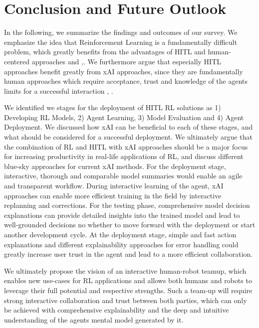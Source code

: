 \documentclass[twoside,11pt]{article}
\begin{document}
\section{Conclusion and Future Outlook}
In the following, we summarize the findings and outcomes of our survey. We emphasize the idea that Reinforcement Learning is a fundamentally difficult problem, which greatly benefits from the advantages of HITL and human-centered approaches and \citep{MatthewsonPilarski:2022:DesigningAndEvaluatingHCIML},\citep{Li:2019:HumanCenteredRLSurvey}. We furthermore argue that especially HITL approaches benefit greatly from xAI approaches, since they are fundamentally human approaches which require acceptance, trust and knowledge of the agents limits for a successful interaction \citep{heuillet2021explainability}, \citep{milani2022survey}.

We identified we stages for the deployment of HITL RL solutions as 1) Developing RL Models, 2) Agent Learning, 3) Model Evaluation and 4) Agent Deployment. We discussed how xAI can be beneficial to each of these stages, and what should be considered for a successful deployment. 
We ultimately argue that the combination of RL and HITL with xAI approaches should be a major focus for increasing productivity in real-life applications of RL, and discuss different blue-sky approaches for current xAI methods. For the deployment stage, interactive, thorough and comparable model summaries would enable an agile and transparent workflow. During interactive learning of the agent, xAI approaches can enable more efficient training in the field by interactive replanning and corrections. For the testing phase, comprehensive model decision explanations can provide detailed insights into the trained model and lead to well-grounded decisions no whether to move forward with the deployment or start another development cycle. At the deployment stage, simple and fast action explanations and different explainability approaches for error handling could greatly increase user trust in the agent and lead to a more efficient collaboration.

We ultimately propose the vision of an interactive human-robot teamup, which enables new use-cases for RL applications and allows both humans and robots to leverage their full potential and respective strengths. Such a team-up will require strong interactive collaboration and trust between both parties, which can only be achieved with comprehensive explainability and the deep and intuitive understanding of the agents mental model generated by it.
\end{document}
